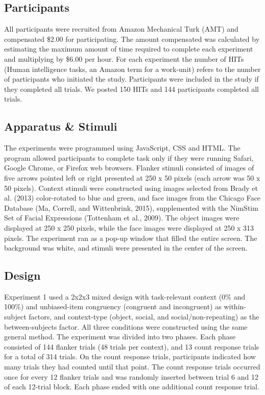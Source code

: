 \documentclass[]{DissertateCUNY}
\begin{document}
\hypertarget{participants}{%
\subsection{Participants}\label{participants}}

All participants were recruited from Amazon Mechanical Turk (AMT) and
compensated \$2.00 for participating. The amount compensated was
calculated by estimating the maximum amount of time required to complete
each experiment and multiplying by \$6.00 per hour. For each experiment
the number of HITs (Human intelligence tasks, an Amazon term for a
work-unit) refers to the number of participants who initiated the study.
Participants were included in the study if they completed all trials. We
posted 150 HITs and 144 participants completed all trials.

\hypertarget{apparatus-stimuli-4}{%
\subsection{Apparatus \& Stimuli}\label{apparatus-stimuli-4}}

The experiments were programmed using JavaScript, CSS and HTML. The
program allowed participants to complete task only if they were running
Safari, Google Chrome, or Firefox web browsers. Flanker stimuli
consisted of images of five arrows pointed left or right presented at
250 x 50 pixels (each arrow was 50 x 50 pixels). Context stimuli were
constructed using images selected from Brady et al. (2013) color-rotated
to blue and green, and face images from the Chicago Face Database (Ma,
Correll, and Wittenbrink, 2015), supplemented with the NimStim Set of
Facial Expressions (Tottenham et al., 2009). The object images were
displayed at 250 x 250 pixels, while the face images were displayed at
250 x 313 pixels. The experiment ran as a pop-up window that filled the
entire screen. The background was white, and stimuli were presented in
the center of the screen.

\hypertarget{design-4}{%
\subsection{Design}\label{design-4}}

Experiment 1 used a 2x2x3 mixed design with task-relevant context (0\%
and 100\%) and unbiased-item congruency (congruent and incongruent) as
within-subject factors, and context-type (object, social, and
social/non-repeating) as the between-subjects factor. All three
conditions were constructed using the same general method. The
experiment was divided into two phases. Each phase consisted of 144
flanker trials (48 trials per context), and 13 count response trials for
a total of 314 trials. On the count response trials, participants
indicated how many trials they had counted until that point. The count
response trials occurred once for every 12 flanker trials and was
randomly inserted between trial 6 and 12 of each 12-trial block. Each
phase ended with one additional count response trial.
\end{document}
